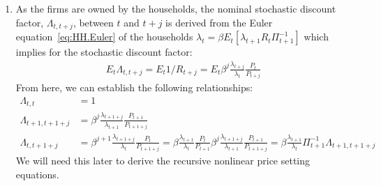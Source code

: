 \begin{enumerate}
\item As the firms are owned by the households, the nominal stochastic discount factor,
  \(\Lambda_{t,t+j}\), between \(t\) and \(t+j\) is derived from the Euler equation~\eqref{eq:HH.Euler} of the households
  \(\lambda_t = \beta E_t \left[\lambda_{t+1} R_t \Pi_{t+1}^{-1} \right]\)
  which implies for the stochastic discount factor:
\begin{align*}
	E_t \Lambda_{t,t+j} = E_t 1/R_{t+j} = E_t\beta^j \frac{\lambda_{t+j}}{\lambda_{t}}\frac{P_t}{P_{t+j}}
\end{align*}
From here, we can establish the following relationships:
\begin{align}
	\Lambda_{t,t} &= 1 \label{eq:Firms.Stochastic.Discount.Current}
	\\
	\Lambda_{t+1,t+1+j} & = \beta^j \frac{\lambda_{t+1+j}}{\lambda_{t+1}} \frac{P_{t+1}}{P_{t+1+j}}
	\\
	\Lambda_{t,t+1+j} & = \beta^{j+1} \frac{\lambda_{t+1+j}}{\lambda_{t}} \frac{P_{t}}{P_{t+1+j}} = \beta \frac{\lambda_{t+1}}{\lambda_{t}} \frac{P_{t}}{P_{t+1}} \beta^j \frac{\lambda_{t+1+j}}{\lambda_{t+1}} \frac{P_{t+1}}{P_{t+1+j}} = \beta \frac{\lambda_{t+1}}{\lambda_t} \Pi_{t+1}^{-1} \Lambda_{t+1,t+1+j} \label{eq:Firms.Stochastic.Discount.Relationship}
\end{align}
We will need this later to derive the recursive nonlinear price setting equations.


\end{enumerate}
